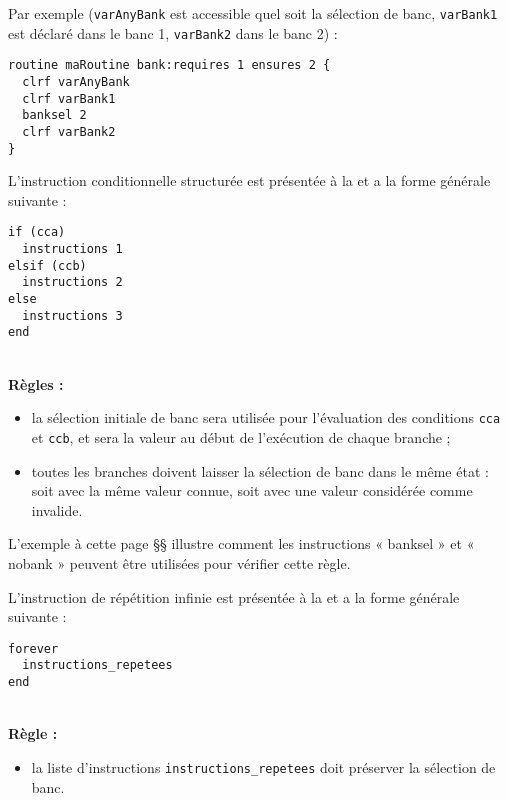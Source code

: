 Par exemple (\texttt{varAnyBank} est accessible quel soit la sélection de banc, \texttt{varBank1} est déclaré dans le banc 1, \texttt{varBank2} dans le banc 2) :
\begin{lstlisting}[language=piccolo]
routine maRoutine bank:requires 1 ensures 2 {
  clrf varAnyBank
  clrf varBank1
  banksel 2
  clrf varBank2
}
\end{lstlisting}










L'instruction conditionnelle structurée est présentée à la  et a la forme générale suivante :

\begin{lstlisting}[language=piccolo]
if (cca)
  instructions 1
elsif (ccb)
  instructions 2
else
  instructions 3
end
\end{lstlisting}

~\\
\textbf{Règles :}
\begin{itemize}
  \item la sélection initiale de banc sera utilisée pour l’évaluation des conditions \texttt{cca} et \texttt{ccb}, et sera la valeur au début de l'exécution de chaque branche ;
  \item toutes les branches doivent laisser la sélection de banc dans le même état : soit avec la même valeur connue, soit avec une valeur considérée comme invalide.
\end{itemize}

L’exemple à cette page §§ illustre comment les instructions « banksel » et « nobank » peuvent être utilisées pour vérifier cette règle. 



L'instruction de répétition infinie est présentée à la  et a la forme générale suivante :

\begin{lstlisting}[language=piccolo]
forever
  instructions_repetees
end
\end{lstlisting}

~\\
\textbf{Règle :}
\begin{itemize}
  \item la liste d'instructions \texttt{instructions\_repetees} doit préserver la sélection de banc.
\end{itemize}



